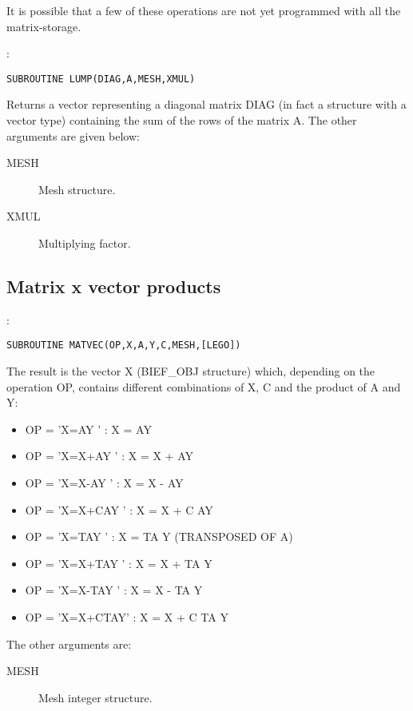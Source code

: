 It is possible that a few of these operations are not yet programmed with all
the matrix-storage.

:
\begin{lstlisting}[language=TelFortran]
SUBROUTINE LUMP(DIAG,A,MESH,XMUL)
\end{lstlisting}

Returns a vector representing a diagonal matrix DIAG (in fact a
 structure with a vector type) containing the sum of the rows
of the matrix A.  The other arguments are given below:

\begin{description}
  \item [MESH] Mesh structure.
  \item [XMUL] Multiplying factor.
\end{description}

\subsection{Matrix x vector products}

:
\begin{lstlisting}[language=TelFortran]
SUBROUTINE MATVEC(OP,X,A,Y,C,MESH,[LEGO])
\end{lstlisting}

The result is the vector X (BIEF\_OBJ structure) which, depending on the
operation OP, contains different combinations of X, C and the product of A and
Y:
\begin{itemize}
  \item OP = 'X=AY    '  : X = AY
  \item OP = 'X=X+AY  '  : X = X + AY
  \item OP = 'X=X-AY  '  : X = X - AY
  \item OP = 'X=X+CAY '  : X = X + C AY
  \item OP = 'X=TAY   '  : X = TA Y (TRANSPOSED OF A)
  \item OP = 'X=X+TAY '  : X = X + TA Y
  \item OP = 'X=X-TAY '  : X = X - TA Y
  \item OP = 'X=X+CTAY'  : X = X + C TA Y
\end{itemize}

The other arguments are:
\begin{description}
  \item [MESH] Mesh integer structure.
\end{description}

